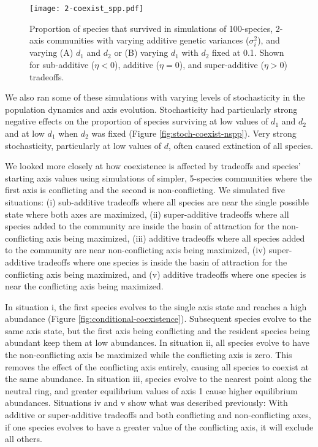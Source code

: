 \begin{figure}[ht!]
\centering
\texttt{[image: 2-coexist\_spp.pdf]}
\caption{Proportion of species that survived in simulations of 100-species, 2-axis
    communities with varying additive genetic variances ($\sigma_i^2$), and 
    varying (A) $d_1$ and $d_2$ or (B) varying $d_1$ with $d_2$ fixed at 0.1.
    Shown for sub-additive ($\eta < 0$), additive ($\eta = 0$), and 
    super-additive ($\eta > 0$) tradeoffs.}
\label{fig:coexistence-spp}
\end{figure}


We also ran some of these simulations with varying levels of stochasticity
in the population dynamics and axis evolution.
Stochasticity had particularly strong negative effects on the proportion
of species surviving at low values of $d_1$ and $d_2$ and at low $d_1$
when $d_2$ was fixed (Figure \ref{fig:stoch-coexist-nspp}).
Very strong stochasticity, particularly at low values of $d$, often caused
extinction of all species.



We looked more closely at how coexistence is affected by tradeoffs and 
species' starting axis values
using simulations of simpler, 5-species communities where the first 
axis is conflicting and the second is non-conflicting.
We simulated five situations:
(i) sub-additive tradeoffs where all species are near the single
possible state where both axes are maximized,
(ii) super-additive tradeoffs where all species added to the community
are inside the basin of attraction for the non-conflicting axis
being maximized,
(iii) additive tradeoffs where all species added to the community
are near non-conflicting axis being maximized,
(iv) super-additive tradeoffs where one species is
inside the basin of attraction for the conflicting axis
being maximized,
and
(v) additive tradeoffs where one species is near the conflicting 
axis being maximized.

In situation i, the first species evolves to the single
axis state and reaches a high abundance (Figure
\ref{fig:conditional-coexistence}).
Subsequent species evolve to the same axis state, but the first axis
being conflicting and the resident species being abundant keep them
at low abundances.
In situation ii, all species evolve to have the non-conflicting axis
be maximized while the conflicting axis is zero.
This removes the effect of the conflicting axis entirely, causing all
species to coexist at the same abundance.
In situation iii, species evolve to the nearest point along the
neutral ring, and greater equilibrium values of axis 1 cause
higher equilibrium abundances.
Situations iv and v show what was described previously:
With additive or super-additive tradeoffs and both conflicting
and non-conflicting axes, if one species evolves to have a greater
value of the conflicting axis, it will exclude all others.


